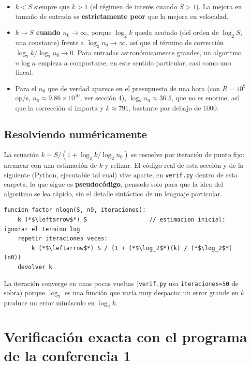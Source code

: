 \documentclass[11pt]{article}
\begin{document}
\begin{itemize}
\item \textbf{$k<S$} siempre que $k>1$ (el régimen de interés cuando $S>1$). La mejora en tamaño de
entrada es \textbf{estrictamente peor} que la mejora en velocidad.
\item \textbf{$k\to S$ cuando $n_0\to\infty$}, porque $\log_2 k$ queda acotado (del orden de $\log_2 S$,
una constante) frente a $\log_2 n_0\to\infty$, así que el término de corrección
$\log_2 k/\log_2 n_0\to 0$. Para entradas astronómicamente grandes, un algoritmo $n\log n$ empieza a
comportarse, en este sentido particular, casi como uno lineal.
\item Para el $n_0$ que de verdad aparece en el presupuesto de una hora (con $R=10^9$ op/s,
$n_0\approx 9.86\times10^{10}$, ver sección 4), $\log_2 n_0\approx 36.5$, que no es enorme, así que la
corrección sí importa y $k\approx 791$, bastante por debajo de 1000.
\end{itemize}

\subsection*{Resolviendo numéricamente}

La ecuación $k=S/(1+\log_2 k/\log_2 n_0)$ se resuelve por iteración de punto fijo: arrancar con una
estimación de $k$ y refinar. El código real de esta sección y de la siguiente (Python, ejecutable tal
cual) vive aparte, en \texttt{verif.py} dentro de esta carpeta; lo que sigue es \textbf{pseudocódigo},
pensado solo para que la idea del algoritmo se lea rápido, sin el detalle sintáctico de un lenguaje
particular.

\begin{lstlisting}[style=pseudo]
funcion factor_nlogn(S, n0, iteraciones):
    k (*$\leftarrow$*) S                  // estimacion inicial: ignorar el termino log
    repetir iteraciones veces:
        k (*$\leftarrow$*) S / (1 + (*$\log_2$*)(k) / (*$\log_2$*)(n0))
    devolver k
\end{lstlisting}

La iteración converge en unas pocas vueltas (\texttt{verif.py} usa \texttt{iteraciones=50} de sobra) porque
$\log_2$ es una función que varía muy despacio: un error grande en $k$ produce un error minúsculo en
$\log_2 k$.

\section{Verificación exacta con el programa de la conferencia 1}
\end{document}
